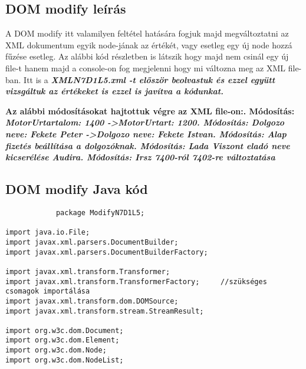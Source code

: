 \documentclass[14pt]{extarticle}
\begin{document}
\begin{normalsize}
		\subsection{DOM modify leírás}
		\begin{normalsize}
			A DOM modify itt valamilyen feltétel hatására fogjuk majd megváltoztatni az XML dokumentum egyik node-jának az értékét, vagy esetleg egy új node hozzá fűzése esetleg. Az alábbi kód részletben is látszik hogy majd nem csinál egy új file-t hanem majd a console-on fog megjelenni hogy mi változna meg az XML file-ban. Itt is a 	\bfseries\itshape XMLN7D1L5.xml \mdseries\upshape -t először beolvastuk és ezzel együtt vizsgáltuk az értékeket is ezzel is javítva a kódunkat.\pagebreak
			
			\bfseries Az alábbi módosításokat hajtottuk végre az XML file-on:\mdseries{}. \bfseries Módosítás: \mdseries\itshape MotorUrtartalom: 1400 -\textgreater MotorUrtart: 1200\upshape{}. \bfseries Módosítás: \mdseries\itshape Dolgozo neve: Fekete Peter -\textgreater Dolgozo neve: Fekete Istvan\upshape{}. \bfseries Módosítás: \mdseries\itshape Alap fizetés beállítása a dolgozóknak\upshape{}. \bfseries Módosítás: \mdseries\itshape Lada Viszont eladó neve kicserélése Audira\upshape{}. \bfseries Módosítás: \mdseries\itshape Irsz 7400-ról 7402-re változtatása\newline\upshape

		\end{normalsize}
		\subsection{DOM modify Java kód}
		\small
		\begin{verbatim}
			package ModifyN7D1L5;

import java.io.File;
import javax.xml.parsers.DocumentBuilder;
import javax.xml.parsers.DocumentBuilderFactory;

import javax.xml.transform.Transformer;
import javax.xml.transform.TransformerFactory;     //szükséges csomagok importálása
import javax.xml.transform.dom.DOMSource;
import javax.xml.transform.stream.StreamResult;

import org.w3c.dom.Document;
import org.w3c.dom.Element;
import org.w3c.dom.Node;
import org.w3c.dom.NodeList;


\end{verbatim}
\end{normalsize}
\end{document}
